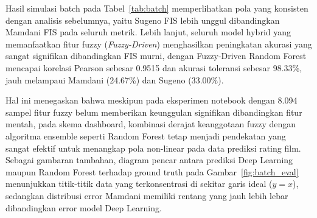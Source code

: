 \documentclass[11pt,a4paper]{article}
\begin{document}
Hasil simulasi batch pada Tabel~\ref{tab:batch} memperlihatkan pola yang konsisten dengan analisis sebelumnya, yaitu Sugeno FIS lebih unggul dibandingkan Mamdani FIS pada seluruh metrik. Lebih lanjut, seluruh model hybrid yang memanfaatkan fitur fuzzy (\textit{Fuzzy-Driven}) menghasilkan peningkatan akurasi yang sangat signifikan dibandingkan FIS murni, dengan Fuzzy-Driven Random Forest mencapai korelasi Pearson sebesar 0.9515 dan akurasi toleransi sebesar 98.33\%, jauh melampaui Mamdani (24.67\%) dan Sugeno (33.00\%). 

Hal ini menegaskan bahwa meskipun pada eksperimen notebook dengan 8.094 sampel fitur fuzzy belum memberikan keunggulan signifikan dibandingkan fitur mentah, pada skema dashboard, kombinasi derajat keanggotaan fuzzy dengan algoritma ensemble seperti Random Forest tetap menjadi pendekatan yang sangat efektif untuk menangkap pola non-linear pada data prediksi rating film. Sebagai gambaran tambahan, diagram pencar antara prediksi Deep Learning maupun Random Forest terhadap ground truth pada Gambar~\ref{fig:batch_eval} menunjukkan titik-titik data yang terkonsentrasi di sekitar garis ideal ($y = x$), sedangkan distribusi error Mamdani memiliki rentang yang jauh lebih lebar dibandingkan error model Deep Learning.

\end{document}
